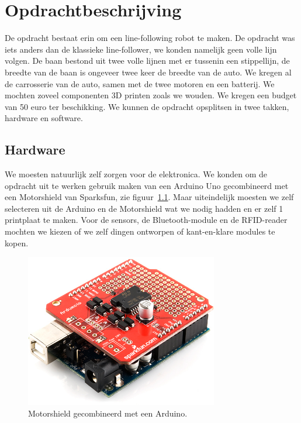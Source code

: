 \chapter{Opdrachtbeschrijving}
De opdracht bestaat erin om een line-following robot te maken. De opdracht was iets anders dan de klassieke line-follower, we konden namelijk geen volle lijn volgen. De baan bestond uit twee volle lijnen met er tussenin een stippellijn, de breedte van de baan is ongeveer twee keer de breedte van de auto. We kregen al de carrosserie van de auto, samen met de twee motoren en een batterij. We mochten zoveel componenten 3D printen zoals we wouden. We kregen een budget van 50 euro ter beschikking. We kunnen de opdracht opsplitsen in twee takken, hardware en software.
\section{Hardware}
We moesten natuurlijk zelf zorgen voor de elektronica. We konden om de opdracht uit te werken gebruik maken van een Arduino Uno gecombineerd met een Motorshield van Sparksfun, zie figuur~\ref{fig:ArduMoto}. Maar uiteindelijk moesten we zelf selecteren uit de Arduino en de Motorshield wat we nodig hadden en er zelf 1 printplaat te maken. Voor de sensors, de Bluetooth-module en de RFID-reader mochten we kiezen of we zelf dingen ontworpen of kant-en-klare modules te kopen.
\begin{figure}[h]
\centering
\includegraphics[width=0.75\textwidth]{ArduMoto.png}
\caption{Motorshield gecombineerd met een Arduino. \label{fig:ArduMoto}}
\end{figure}
